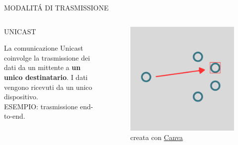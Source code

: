 \documentclass[aspectratio=1610]{beamer}
\begin{document}
\begin{frame}{MODALIT\'A DI TRASMISSIONE}
    \begin{columns}
        \begin{alertblock}{UNICAST}
            \begin{minipage}{0.96\linewidth}
                \justifying
                La comunicazione Unicast coinvolge la trasmissione dei dati da un mittente a \textbf{un 
                unico destinatario}. I dati vengono ricevuti da un unico dispositivo.\\
                ESEMPIO: trasmissione end-to-end.
            \end{minipage}
        \end{alertblock}
           \begin{figure}
               \includegraphics[width=\linewidth]{img/unicast.png}
               \caption{{creata con \href{https://www.canva.com}{Canva}}}
           \end{figure}
    \end{columns}
\end{frame}
\end{document}
